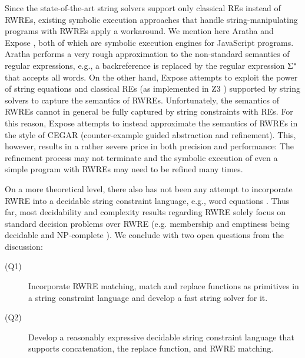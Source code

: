Since the state-of-the-art string solvers support only classical REs instead of
RWREs, %
existing symbolic execution approaches that handle
string-manipulating programs with RWREs apply a workaround.
We mention here Aratha \cite{aratha} and Expose \cite{LMK19}, both of which are
symbolic execution engines for JavaScript programs.
Aratha performs a very rough approximation to the 
non-standard semantics of regular expressions, e.g., a backreference
is replaced by the regular expression $\Sigma^*$ that accepts all words.
On the other hand, Expose attempts to exploit the power of string 
equations and classical REs (as implemented in Z3 \cite{Z3}) supported by string
solvers to capture the 
semantics of RWREs. Unfortunately, the semantics of RWREs cannot 
in general be fully captured by string constraints with REs. 
For this reason, 
Expose attempts to instead approximate the semantics of RWREs in the style of 
CEGAR (counter-example guided abstraction and refinement). This, however,
results in a rather severe price in both precision and performance: The
refinement process may not terminate and the symbolic execution of even a simple
program with RWREs may need to be refined many times.

On a more theoretical level, there also has not been any attempt to incorporate
RWRE into a decidable string constraint language, e.g., word equations
\cite{Gut98}. Thus far, most decidability and complexity results regarding RWRE 
solely focus on standard decision problems over RWRE (e.g. membership and 
emptiness being decidable and NP-complete \cite{FS19,BM17b}). 
We conclude with two open questions from the discussion:
\begin{description}
    \item[(Q1)] Incorporate RWRE matching, match and replace functions
        as primitives in a string constraint language and develop a 
        fast string solver for it.
    \item[(Q2)] Develop a reasonably expressive decidable string constraint 
        language that supports concatenation, the replace function, and RWRE
        matching.
\end{description}

